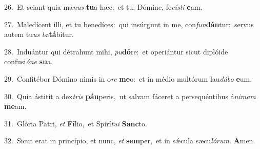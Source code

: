 {\numbfont\textcolor{\numbcolor}{26.}}~Et sciant quia ma\textit{nus} \textbf{tu}\-a hæc:~\star et tu, Dómine, fe\-\textit{cís}\-\textit{ti} \textbf{e}\-am.\par
{\numbfont\textcolor{\numbcolor}{27.}}~Maledícent illi, et tu benedíces:~\dagger qui insúrgunt in me, con\-\textit{fun}\-\textbf{dán}tur:~\star servus autem tu\textit{us} \textit{læ}\-\textbf{tá}bitur.\par
{\numbfont\textcolor{\numbcolor}{28.}}~Induántur qui détrahunt mihi, \textit{pu}\-\textbf{dó}re:~\star et operiántur sicut diplóide confusi\-\textit{ó}\-\textit{ne} \textbf{su}\-a.\par
{\numbfont\textcolor{\numbcolor}{29.}}~Confitébor Dómino nimis in o\textit{re} \textbf{me}\-o:~\star et in médio multórum lau\-\textit{dá}\-\textit{bo} \textbf{e}\-um.\par
{\numbfont\textcolor{\numbcolor}{30.}}~Quia ástitit a dex\textit{tris} \textbf{páu}\-peris,~\star ut salvam fáceret a persequéntibus á\-\textit{ni}\-\textit{mam} \textbf{me}\-am.\par
{\numbfont\textcolor{\numbcolor}{31.}}~Glória Patri, \textit{et} \textbf{Fí}\-lio,~\star et Spirí\-\textit{tu}\-\textit{i} \textbf{Sanc}\-to.\par
{\numbfont\textcolor{\numbcolor}{32.}}~Sicut erat in princípio, et nunc, \textit{et} \textbf{sem}\-per,~\star et in sǽcula sæcu\-\textit{ló}\-\textit{rum}. \textbf{A}\-men.\par
